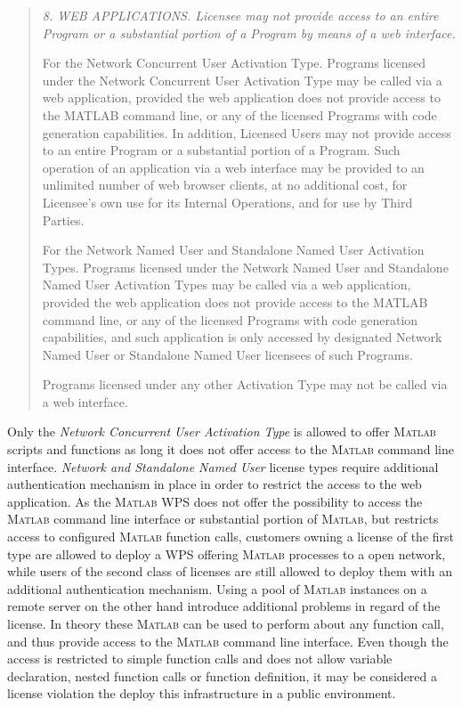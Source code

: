 		\begin{quote}\itshape\small
			8. WEB APPLICATIONS.  Licensee may not provide access to an entire Program or a substantial portion of a Program by means of a web interface.

			For the Network Concurrent User Activation Type.  Programs licensed under the Network Concurrent User Activation Type may be called via a web application, provided the web application does not provide access to the MATLAB command line, or any of the licensed Programs with code generation capabilities.  In addition, Licensed Users may not provide access to an entire Program or a substantial portion of a Program.  Such operation of an application via a web interface may be provided to an unlimited number of web browser clients, at no additional cost, for Licensee's own use for its Internal Operations, and for use by Third Parties.

			For the Network Named User and Standalone Named User Activation Types. Programs licensed under the Network Named User and Standalone Named User Activation Types may be called via a web application, provided the web application does not provide access to the MATLAB command line, or any of the licensed Programs with code generation capabilities, and such application is only accessed by designated Network Named User or Standalone Named User licensees of such Programs.

			Programs licensed under any other Activation Type may not be called via a web interface.
		\end{quote}

		Only the \emph{Network Concurrent User Activation Type} is allowed to offer \textsc{Matlab} scripts and functions as long it does not offer access to the \textsc{Matlab} command line interface. \emph{Network and Standalone Named User} license types require additional authentication mechanism in place in order to restrict the access to the web application. As the \textsc{Matlab} WPS does not offer the possibility to access the \textsc{Matlab} command line interface or substantial portion of \textsc{Matlab}, but restricts access to configured \textsc{Matlab} function calls, customers owning a license of the first type are allowed to deploy a \ac{WPS} offering \textsc{Matlab} processes to a open network, while users of the second class of licenses are still allowed to deploy them with an additional authentication mechanism. Using a pool of \textsc{Matlab} instances on a remote server on the other hand introduce additional problems in regard of the license. In theory these \textsc{Matlab} can be used to perform about any function call, and thus provide access to the \textsc{Matlab} command line interface. Even though the access is restricted to simple function calls and does not allow variable declaration, nested function calls or function definition, it may be considered a license violation the deploy this infrastructure in a public environment.

